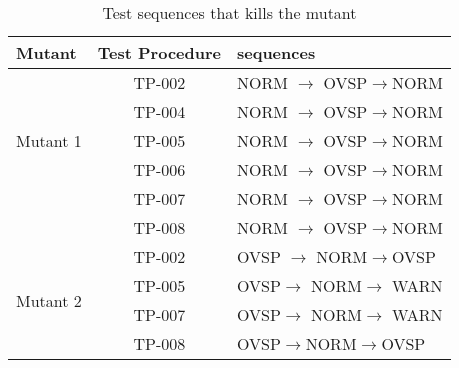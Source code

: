 \begin{table}[htbp]
\caption{\label{tbl:sequence}Test sequences that kills the mutant}
\centering
\begin{tabular}{|l|c|l|}\hline\hline
 Mutant & Test Procedure & sequences\\\hline
\multirow{5}{*}{Mutant 1} &  TP-002 & \small{NORM} $\rightarrow$
\small{OVSP}$\rightarrow$\small{NORM} \\
&  TP-004 & \small{NORM} $\rightarrow$ \small{OVSP}$\rightarrow$\small{NORM} \\
&  TP-005 & \small{NORM} $\rightarrow$ \small{OVSP}$\rightarrow$\small{NORM} \\
&  TP-006 & \small{NORM} $\rightarrow$ \small{OVSP}$\rightarrow$\small{NORM} \\
&  TP-007 & \small{NORM} $\rightarrow$ \small{OVSP}$\rightarrow$\small{NORM} \\
&  TP-008 & \small{NORM} $\rightarrow$ \small{OVSP}$\rightarrow$\small{NORM} \\\hline
 \multirow{4}{*}{Mutant 2} & TP-002 & \small{OVSP} $\rightarrow$ \small{NORM}$\rightarrow$\small{OVSP} \\
& TP-005 & \small{OVSP}$\rightarrow$ \small{NORM}$\rightarrow$ \small{WARN}\\
& TP-007 & \small{OVSP}$\rightarrow$ \small{NORM}$\rightarrow$ \small{WARN}\\
& TP-008 & \small{OVSP}$\rightarrow$\small{NORM}$\rightarrow$\small{OVSP} \\\hline
\hline
\end{tabular}
\end{table}
